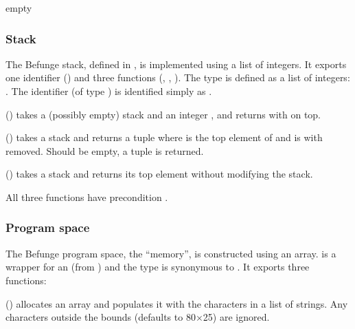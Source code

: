 \documentclass[12pt, a4paper]{article}
\begin{document}
empty

\subsubsection{Stack}
\label{sec:structstack}

The Befunge stack, defined in , is implemented using a list of integers. It exports one identifier () and three functions (, , ). The type  is defined as a list of integers: . The identifier  (of type ) is identified simply as .

\vspace{6pt}
\noindent
{} () takes a (possibly empty) stack  and an integer , and returns  with  on top.

\vspace{6pt}
\noindent
{} () takes a stack  and returns a tuple  where  is the top element of  and  is  with  removed. Should  be empty, a tuple  is returned.

\vspace{6pt}
\noindent
{} () takes a stack and returns its top element without modifying the stack.

\vspace{6pt}
\noindent
All three functions have precondition .

\subsubsection{Program space}
\label{sec:structmem}

The Befunge program space, the “memory”, is constructed using an array.  is a wrapper for an  (from ) and the type  is synonymous to . It exports three functions:

\vspace{6pt}
\noindent
{} () allocates an array and populates it with the characters in a list of strings. Any characters outside the bounds (defaults to 80$\times$25) are ignored.
\end{document}
